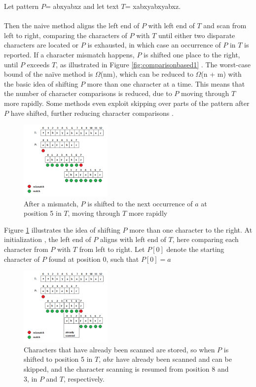 \documentclass[12pt]{article} %
\begin{document}
Let pattern $P$=  abxyabxz and let text $T$= xabxyabxyabxz.
\\ \\
Then the naive method aligns the left end of $P$  with left end of $T$ and scan from left to right, comparing the characters of $P$ with $T$ until either two disparate characters are located or $P$ is exhausted, in which case an occurrence of $P$ in $T$ is reported. If a character mismatch happens, $P$ is shifted one place to the right, until $P$ exceeds $T$, as illustrated in Figure \ref{fig:comparisonbased1} \cite{gusfield}.
The worst-case bound of the naïve method is $\Omega$(nm), which can be reduced to $\Omega$(n + m) with the basic idea of shifting $P$ more than one character at a time. This means that the number of character comparisons is reduced, due to $P$ moving through $T$ more rapidly. Some methods even exploit skipping over parts of the pattern after $P$ have shifted, further reducing character comparisons \cite{gusfield}. 
\begin{figure}[H]
    \centering
    \includegraphics[width=0.4\textwidth]{comparisonbased2}
    \captionsetup{width=0.8\textwidth}
    \caption{After a mismatch, $P$ is shifted to the next occurrence of $a$ at position 5 in $T$, moving through $T$ more rapidly}
    \label{fig:comparisonbased2}
\end{figure}
\newline   
Figure \ref{fig:comparisonbased2}  illustrates the idea of shifting $P$ more than one character to the right. At initialization , the left end of $P$ aligns with left end of $T$, here comparing each character from $P$ with $T$ from left to right.
\newline
Let $P[0]$ denote the starting character of $P$ found at position 0, such that $P[0]=a$
\newline
\begin{figure}[H]
    \centering
    \includegraphics[width=0.4\textwidth]{comparisonbased3}
    \captionsetup{width=0.8\textwidth}
    \caption{Characters that have already been scanned are stored, so when $P$ is shifted to position 5 in $T$, $abx$ have already been scanned and can be skipped, and the character scanning is resumed from position 8 and 3, in $P$ and $T$, respectively.}
    \label{fig:comparisonbased3}
\end{figure}
\end{document}
